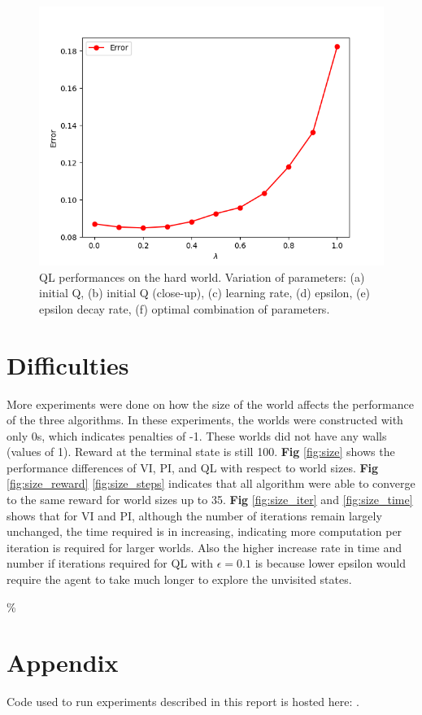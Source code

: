 \documentclass[10pt]{article}
\begin{document}
\begin{figure}[h!]
  \centering
  \includegraphics[width=\linewidth]{../results/experiment3_2.png}
     \caption{QL performances on the hard world. Variation of parameters: (a) initial Q, (b) initial Q (close-up), (c) learning rate, (d) epsilon, (e) epsilon decay rate, (f) optimal combination of parameters.}
  \label{fig:fig5}
\end{figure}





\section{Difficulties} \label{difficulties}

More experiments were done on how the size of the world affects the performance of the three algorithms. In these experiments, the worlds were constructed with only 0s, which indicates penalties of -1. These worlds did not have any walls (values of 1). Reward at the terminal state is still 100. \textbf{Fig} \ref{fig:size} shows the performance differences of VI, PI, and QL with respect to world sizes. \textbf{Fig} \ref{fig:size_reward} \ref{fig:size_steps} indicates that all algorithm were able to converge to the same reward for world sizes up to 35. \textbf{Fig} \ref{fig:size_iter} and \ref{fig:size_time} shows that for VI and PI, although the number of iterations remain largely unchanged, the time required is in increasing, indicating more computation per iteration is required for larger worlds. Also the higher increase rate in time and number if iterations required for QL with $\epsilon=0.1$ is because lower epsilon would require the agent to take much longer to explore the unvisited states.




\%%







\section{Appendix} \label{appendix}
Code used to run experiments described in this report is hosted here: . 

%
%
\end{document}
